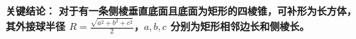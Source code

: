 \begin{examplebox}
	\textbf{\textcolor{CExample}{关键结论：}}
	\textbf{对于有一条侧棱垂直底面且底面为矩形的四棱锥，可补形为长方体，其外接球半径 $R=\frac{\sqrt{a^{2}+b^{2}+c^{2}}}{2}$，$a,b,c$ 分别为矩形相邻边长和侧棱长。}
\end{examplebox}
